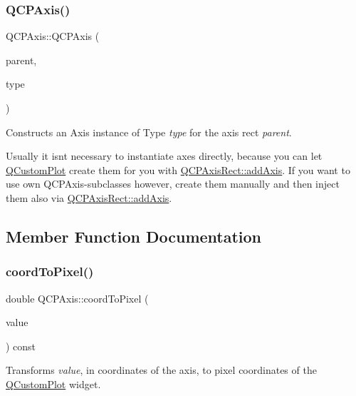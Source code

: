 \subsubsection{\texorpdfstring{Q\+C\+P\+Axis()}{QCPAxis()}}
{\footnotesize\ttfamily Q\+C\+P\+Axis\+::\+Q\+C\+P\+Axis (\begin{DoxyParamCaption}\item[{\hyperlink{class_q_c_p_axis_rect}{Q\+C\+P\+Axis\+Rect} $\ast$}]{parent,  }\item[{\hyperlink{class_q_c_p_axis_ae2bcc1728b382f10f064612b368bc18a}{Axis\+Type}}]{type }\end{DoxyParamCaption})\hspace{0.3cm}{\ttfamily [explicit]}}

Constructs an Axis instance of Type {\itshape type} for the axis rect {\itshape parent}.

Usually it isn\textquotesingle{}t necessary to instantiate axes directly, because you can let \hyperlink{class_q_custom_plot}{Q\+Custom\+Plot} create them for you with \hyperlink{class_q_c_p_axis_rect_a2dc336092ccc57d44a46194c8a23e4f4}{Q\+C\+P\+Axis\+Rect\+::add\+Axis}. If you want to use own Q\+C\+P\+Axis-\/subclasses however, create them manually and then inject them also via \hyperlink{class_q_c_p_axis_rect_a2dc336092ccc57d44a46194c8a23e4f4}{Q\+C\+P\+Axis\+Rect\+::add\+Axis}. 

\subsection{Member Function Documentation}
\mbox{\label{class_q_c_p_axis_af15d1b3a7f7e9b53d759d3ccff1fe4b4}} 
\subsubsection{\texorpdfstring{coord\+To\+Pixel()}{coordToPixel()}}
{\footnotesize\ttfamily double Q\+C\+P\+Axis\+::coord\+To\+Pixel (\begin{DoxyParamCaption}\item[{double}]{value }\end{DoxyParamCaption}) const}

Transforms {\itshape value}, in coordinates of the axis, to pixel coordinates of the \hyperlink{class_q_custom_plot}{Q\+Custom\+Plot} widget. \mbox{\label{class_q_c_p_axis_a22ab2d71d7341b9b3974c0dd10619af2}} 
